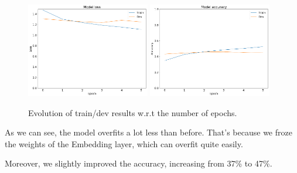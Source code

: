 \documentclass[11pt]{enpc-article}
\begin{document}
\begin{figure}[H]
  \centering
  \includegraphics[width=0.48\textwidth]{learning_curve_innovate.png}
  \includegraphics[width=0.48\textwidth]{learning_curve_accuracy_innovate.png}
  \caption{Evolution of train/dev results w.r.t the number of epochs.}
\end{figure}

As we can see, the model overfits a lot less than before. That's because we froze the weights of the Embedding layer, which can overfit quite easily.

Moreover, we slightly improved the accuracy, increasing from 37\% to 47\%.
\end{document}
